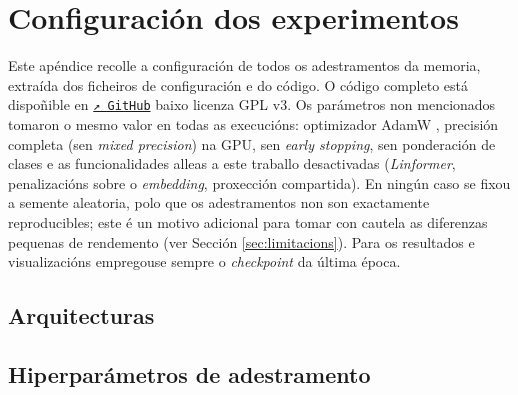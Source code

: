 \chapter{Configuración dos experimentos}
\label{sec:hiperparametros}

Este apéndice recolle a configuración de todos os adestramentos da memoria, extraída dos ficheiros de configuración e do código. O código completo está dispoñible en \href{https://github.com/PepeRoConde/TFG}{\textcolor{udcgray}{\texttt{↗ GitHub}}} baixo licenza GPL v3. Os parámetros non mencionados tomaron o mesmo valor en todas as execucións: optimizador AdamW \cite{adamw}, precisión completa (sen \emph{mixed precision}) na GPU, sen \emph{early stopping}, sen ponderación de clases e as funcionalidades alleas a este traballo desactivadas (\emph{Linformer}, penalizacións sobre o \emph{embedding}, proxección compartida). En ningún caso se fixou a semente aleatoria, polo que os adestramentos non son exactamente reproducibles; este é un motivo adicional para tomar con cautela as diferenzas pequenas de rendemento (ver Sección \ref{sec:limitacions}). Para os resultados e visualizacións empregouse sempre o \emph{checkpoint} da última época.

\section{Arquitecturas}

\begin{table}[htb]
\centering
\small
{}
\caption[Arquitecturas empregadas.]{Arquitecturas empregadas en cada conxunto de datos. Todas elas sen Dropout.}
\label{tab:arquitecturas}
\end{table}

\section{Hiperparámetros de adestramento}

